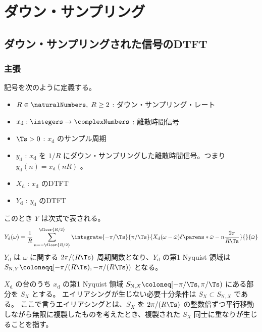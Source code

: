 \chapter{ダウン・サンプリング}
    \section{ダウン・サンプリングされた信号のDTFT}
        \newcommand{\xd}{x_\text{d}}
        \newcommand{\yd}{y_\text{d}}
        \newcommand{\Xd}{X_\text{d}}
        \newcommand{\Yd}{Y_\text{d}}
        \subsection{主張}
            記号を次のように定義する。
            \begin{itemize}
                \item $R\in\naturalNumbers,\;R\geq 2$ : ダウン・サンプリング・レート
                \item $\xd:\integers\to\complexNumbers$ : 離散時間信号
                \item $\Ts>0$ : $\xd$ のサンプル周期
                \item $\yd$ : $\xd$ を $1/R$ にダウン・サンプリングした離散時間信号。つまり $\yd(n) = \xd(nR)$ 。
                \item $\Xd$ : $\xd$ のDTFT
                \item $\Yd$ : $\yd$ のDTFT
            \end{itemize}
            このとき $Y$ は次式で表される。
            \[ \Yd(\omega) = \frac{1}{R}\sum_{n=-\floor{R/2}}^{\floor{R/2}} \integrate{-\pi/\Ts}{\pi/\Ts}{\Xd(\omega-\tilde{\omega})\delta\parens*{\tilde{\omega}-n\frac{2\pi}{R\Ts}}}{}{\tilde{\omega}} \]
            $\Yd$ は $\omega$ に関する $2\pi/(R\Ts)$ 周期関数となり、$\Yd$ の第1 Nyquist 領域は $S_{\text{N},Y} \coloneqq [-\pi/(R\Ts),-\pi/(R\Ts))$ となる。
            \par
            $\Xd$ の台のうち $\xd$ の第1 Nyquist 領域 $S_{\text{N},X} \coloneq [-\pi/\Ts, \pi/\Ts)$ にある部分を $S_X$ とする。
            エイリアシングが生じない必要十分条件は $S_X\subset S_{\text{N},X}$ である。
            ここで言うエイリアシングとは、$S_X$ を $2\pi/(R\Ts)$ の整数倍ずつ平行移動しながら無限に複製したものを考えたとき、複製された $S_X$ 同士に重なりが生じることを指す。
